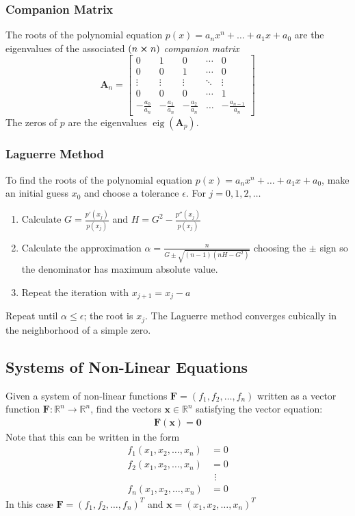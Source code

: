 \documentclass[11pt, a4paper]{article}
\newcommand{\R}{\mathbb{R}} %
\newcommand{\mat}[1]{\mathbf{#1}} %
\begin{document}
\subsubsection{Companion Matrix}
The roots of the polynomial equation $ p(x) = a_n x^n + \dots + a_1 x + a_0 $ are the eigenvalues of the associated $(n \cross n) $ \textit{companion matrix}
\[ \mat{A}_{n} =  
	\begin{bmatrix}
		0 & 1 & 0 & \cdots & 0 \\
		0 & 0 & 1 & \cdots & 0\\
 		\vdots & \vdots & \vdots & \ddots & \vdots \\
		0 & 0 & 0 & \cdots & 1\\
		- \frac{a_0}{a_n} &  - \frac{a_1}{a_n} & - \frac{a_2}{a_n}& \dots &  - \frac{a_{n-1}}{a_n}
	\end{bmatrix}
\]
The zeros of $ p $ are the eigenvalues $\operatorname{eig}(\mat{A}_{p}) $.

 

\subsubsection{Laguerre Method}
To find the roots of the polynomial equation $ p(x) = a_n x^n + \dots + a_1 x + a_0 $, make an initial guess $ x_{0} $ and choose a tolerance $ \epsilon $. For $ j = 0, 1, 2, \dots $

\begin{enumerate}
	\item Calculate $ G = \frac{p'(x_{j})}{p(x_{j})} $ and $ H  = G^{2} - \frac{p''(x_{j})}{p(x_{j})}$
	
	\item Calculate the approximation $ \alpha = \frac{n}{G \pm \sqrt{(n-1)(nH - G^{2})}} $ choosing the $ \pm $ sign so the denominator has maximum absolute value.
	
	\item Repeat the iteration with $ x_{j+1} = x_{j} - a $
\end{enumerate}
Repeat until $ \alpha \leq \epsilon $; the root is $ x_{j} $. The Laguerre method converges cubically in the neighborhood of a simple zero.

\subsection{Systems of Non-Linear Equations}
Given a system of non-linear functions $ \bm{F} = (f_1, f_2, \dots, f_n) $ written as a vector function $ \bm{F} : \R^{n} \to \R^{n} $, find the vectors $ \bm{x} \in \R^{n} $ satisfying the vector equation:
\begin{align*}
	\bm{F}(\bm{x}) = \bm{0}
\end{align*}
Note that this can be written in the form
\begin{align*}
	f_{1}(x_1, x_2, \dots, x_n) &= 0\\
	f_{2}(x_1, x_2, \dots, x_n) &= 0\\
	&\ \, \vdots\\
	f_{n}(x_1, x_2, \dots, x_n) &= 0
\end{align*}
In this case $ \bm{F} = (f_1, f_2, \dots, f_n)^{T} $ and $ \bm{x} = (x_1, x_2, \dots, x_n)^{T}$
\end{document}
